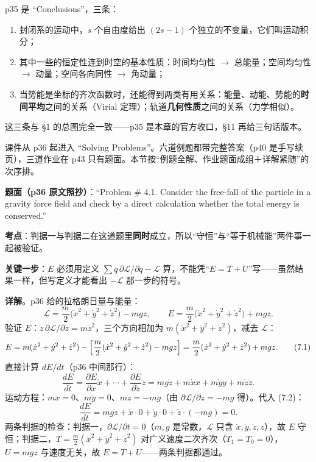 \documentclass[11pt]{ctexart}
\begin{document}

p35 是 “Conclusions”，三条：
\begin{enumerate}
\item 封闭系的运动中，$s$ 个自由度给出 $(2s-1)$ 个独立的不变量，它们叫运动积分；
\item 其中一些的恒定性连到时空的基本性质：时间均匀性 $\to$ 总能量；空间均匀性 $\to$ 动量；空间各向同性 $\to$ 角动量；
\item 当势能是坐标的齐次函数时，还能得到两类有用关系：能量、动能、势能的\textbf{时间平均}之间的关系（Virial 定理）；轨道\textbf{几何性质}之间的关系（力学相似）。
\end{enumerate}
这三条与 §1 的总图完全一致——p35 是本章的官方收口，§11 再给三句话版本。



课件从 p36 起进入 “Solving Problems”。六道例题都带完整答案（p40 是手写续页），三道作业在 p43 只有题面。本节按“例题全解、作业题面成组＋详解紧随”的次序排。


\textbf{题面（p36 原文照抄）}：“Problem \# 4.1. Consider the free-fall of the particle in a gravity force field and check by a direct calculation whether the total energy is conserved.”

\textbf{考点}：判据一与判据二在这道题里\textbf{同时}成立，所以“守恒”与“等于机械能”两件事一起被验证。

\textbf{关键一步}：$E$ 必须用定义 $\sum\dot q\,\partial\mathcal{L}/\partial\dot q-\mathcal{L}$ 算，不能凭“$E=T+U$”写——虽然结果一样，但写定义才能看出 $-\mathcal{L}$ 那一步的符号。

\textbf{详解}。p36 给的拉格朗日量与能量：
\[
\mathcal{L}=\frac{m}{2}\bigl(\dot x^2+\dot y^2+\dot z^2\bigr)-mgz,\qquad
E=\frac{m}{2}\bigl(\dot x^2+\dot y^2+\dot z^2\bigr)+mgz .
\]
验证 $E$：$\dot z\,\partial\mathcal{L}/\partial\dot z=m\dot z^2$，三个方向相加为 $m(\dot x^2+\dot y^2+\dot z^2)$，减去 $\mathcal{L}$：
\[
E=m(\dot x^2+\dot y^2+\dot z^2)-\Bigl[\frac{m}{2}(\dot x^2+\dot y^2+\dot z^2)-mgz\Bigr]=\frac{m}{2}(\dot x^2+\dot y^2+\dot z^2)+mgz . \tag{7.1}
\]
直接计算 $dE/dt$（p36 中间那行）：
\[
\frac{dE}{dt}=\frac{\partial E}{\partial x}\dot x+\cdots+\frac{\partial E}{\partial\dot z}\ddot z
=mg\dot z+m\dot x\ddot x+m\dot y\ddot y+m\dot z\ddot z . \tag{7.2}
\]
运动方程：$m\ddot x=0$、$m\ddot y=0$、$m\ddot z=-mg$（由 $\partial\mathcal{L}/\partial z=-mg$ 得）。代入 (7.2)：
\[
\frac{dE}{dt}=mg\dot z+\dot x\cdot0+\dot y\cdot0+\dot z\cdot(-mg)=0 . \tag{7.3}
\]
两条判据的检查：判据一，$\partial\mathcal{L}/\partial t=0$（$m,g$ 是常数，$\mathcal{L}$ 只含 $\dot x,\dot y,\dot z,z$），故 $E$ 守恒；判据二，$T=\frac{m}{2}(\dot x^2+\dot y^2+\dot z^2)$ 对广义速度二次齐次（$T_1=T_0=0$），$U=mgz$ 与速度无关，故 $E=T+U$——两条判据都通过。
\end{document}
